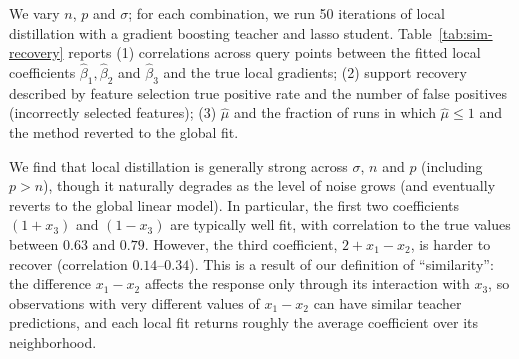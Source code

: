 \documentclass[12pt]{article}
\theoremstyle{definition}
\begin{document}
We vary $n$, $p$ and $\sigma$; for each combination, we run 50 iterations of local distillation with a gradient boosting teacher and lasso student.
Table~\ref{tab:sim-recovery} reports (1) correlations across query points between the fitted local coefficients $\hat\beta_1, \hat\beta_2$ and $\hat\beta_3$ and the true local gradients; (2) support recovery described by feature selection true positive rate and the number of false positives (incorrectly selected features); (3) $\hat\mu$ and the fraction of runs in which $\hat\mu \le 1$ and the method reverted to the global fit.

We find that local distillation is generally strong across $\sigma$, $n$ and $p$ (including $p > n$), though it naturally degrades as the level of noise grows (and eventually reverts to the global linear model). In particular, the first two coefficients $(1 + x_3)$ and $(1 - x_3)$ are typically well fit, with correlation to the true values between $0.63$ and $0.79$. 
However, the third coefficient, $2 + x_1 - x_2$, is harder to recover (correlation $0.14$--$0.34$). This is a result of our definition of ``similarity'': the difference $x_1 - x_2$ affects the response only through its interaction with $x_3$, so observations with very different values of $x_1 - x_2$ can have similar teacher predictions, and each local fit returns roughly the average coefficient over its neighborhood.  
\end{document}
